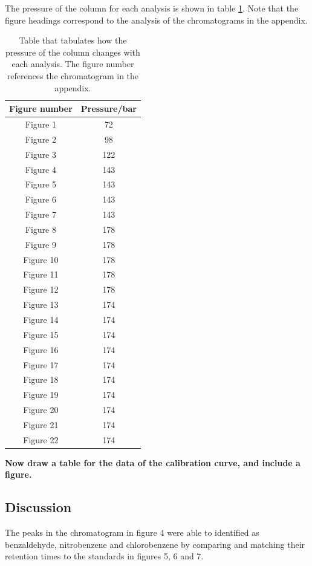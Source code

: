\documentclass[a4paper, 12pt]{article}
\begin{document}
The pressure of the column for each analysis is shown in table \ref{tab-pressure}. Note that the figure headings correspond to the analysis of the chromatograms in the appendix.

\begin{table}[h!]
	\centering
	\caption{Table that tabulates how the pressure of the column changes with each analysis. The figure number references the chromatogram in the appendix.}
	\begin{tabular}{|c|c|}
		\hline
		Figure number & Pressure/bar\\
		\hline
		Figure 1  & 72 \\ 
		\hline
		Figure 2 & 98 \\
		\hline
		Figure 3 & 122 \\
		\hline
		Figure 4 & 143 \\
		\hline
		Figure 5 & 143 \\
		\hline
		Figure 6 & 143 \\
		\hline
		Figure 7 & 143 \\
		\hline
		Figure 8 & 178 \\
		\hline
		Figure 9 & 178 \\
		\hline
		Figure 10 & 178 \\
		\hline
		Figure 11 & 178 \\
		\hline
		Figure 12 & 178 \\
		\hline
		Figure 13 & 174 \\
		\hline
		Figure 14 & 174 \\
		\hline
		Figure 15 & 174 \\
		\hline
		Figure 16 & 174 \\
		\hline
		Figure 17 & 174 \\
		\hline
		Figure 18 & 174 \\
		\hline
		Figure 19 & 174 \\
		\hline
		Figure 20 & 174 \\
		\hline
		Figure 21 & 174 \\
		\hline
		Figure 22 & 174 \\ 
		\hline
	\end{tabular}
	\label{tab-pressure}
\end{table}

\textbf{Now draw a table for the data of the calibration curve, and include a figure.}

\subsection{Discussion}
The peaks in the chromatogram in figure 4 were able to identified as benzaldehyde, nitrobenzene and chlorobenzene by comparing and matching their retention times to the standards in figures 5, 6 and 7. 
\end{document}
